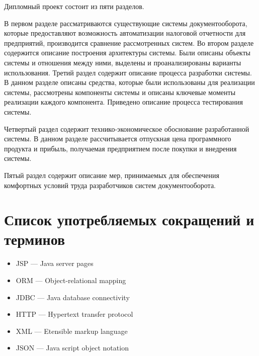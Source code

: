 \documentclass[14pt,a4paper]{reportmod}
\begin{document}
Дипломный проект состоит из пяти разделов.


В первом разделе рассматриваются существующие системы документооборота, которые предоставляют возможность автоматизации налоговой отчетности для предприятий, производится сравнение рассмотренных систем. Во втором разделе содержится описание построения архитектуры системы. Были описаны объекты системы и отношения между ними, выделены и проанализированы варианты использования. Третий раздел содержит описание процесса разработки системы. В данном разделе описаны средства, которые были использованы для реализации системы, рассмотрены компоненты системы и описаны ключевые моменты реализации каждого компонента. Приведено описание процесса тестирования системы.

Четвертый раздел содержит технико-экономическое обоснование разработанной системы. В данном разделе рассчитывается отпускная цена программного продукта и прибыль, получаемая предприятием после покупки и внедрения системы.

Пятый раздел содержит описание мер, принимаемых для обеспечения комфортных условий труда разработчиков систем документооборота.


\chapter*{Список употребляемых сокращений и терминов}
\renewcommand{\labelitemi}{}
\begin{itemize}
   --- Система управления базой данных
   --- Абстрактное синтаксическое дерево
  \item JSP --- Java server pages
  \item ORM --- Object-relational mapping
  \item JDBC --- Java database connectivity
  \item HTTP --- Hypertext transfer protocol
  \item XML --- Etensible markup language
  \item JSON --- Java script object notation
\end{itemize}
\renewcommand{\labelitemi}{---}
\end{document}
